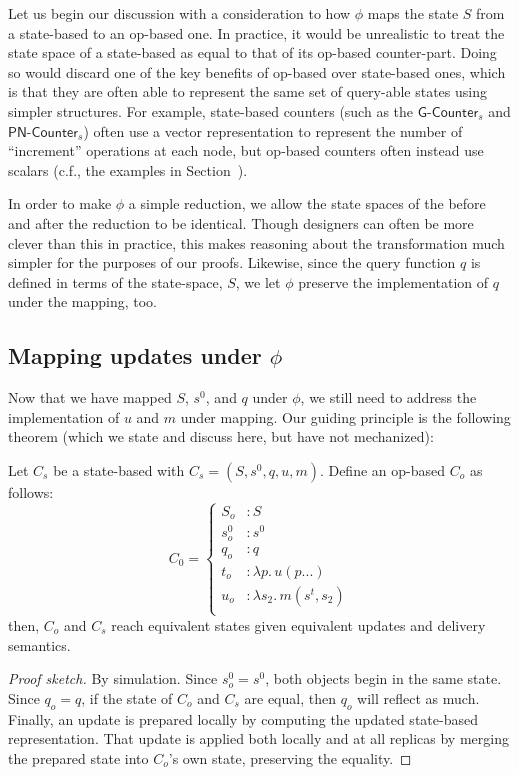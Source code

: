 Let us begin our discussion with a consideration to how $\phi$ maps the state
$S$ from a state-based \CRDT to an op-based one. In practice, it would be
unrealistic to treat the state space of a state-based \CRDT as equal to that of
its op-based counter-part. Doing so would discard one of the key benefits of
op-based \CRDTs over state-based ones, which is that they are often able to
represent the same set of query-able states using simpler structures. For
example, state-based counters (such as the $\textsf{G-Counter}_s$ and
$\textsf{PN-Counter}_s$) often use a vector representation to represent the
number of ``increment'' operations at each node, but op-based counters often
instead use scalars (c.f., the examples in
Section~\label{sec:example-gcounter}).

In order to make $\phi$ a simple reduction, we allow the state spaces of the
\CRDT before and after the reduction to be identical. Though \CRDT designers can
often be more clever than this in practice, this makes reasoning about the
transformation much simpler for the purposes of our proofs.  Likewise, since the
query function $q$ is defined in terms of the state-space, $S$, we let $\phi$
preserve the implementation of $q$ under the mapping, too.

\subsection{Mapping updates under $\phi$}
\label{sec:states-under-phi}
Now that we have mapped $S$, $s^0$, and $q$ under $\phi$, we still need to
address the implementation of $u$ and $m$ under mapping. Our guiding principle
is the following theorem (which we state and discuss here, but have not
mechanized):
\begin{theorem}
  Let $C_s$ be a state-based \CRDT with $C_s = (S, s^0, q, u, m)$. Define an
  op-based \CRDT $C_o$ as follows:
  \[
    C_0 = \left\{ \begin{aligned}
      S_o &: S \\
      s^0_o &: s^0 \\
      q_o &: q \\
      t_o &: \lambda p.\, u(p...) \\
      u_o &: \lambda s_2.\, m(s^t, s_2) \\
    \end{aligned} \right.
  \]
  then, $C_o$ and $C_s$ reach equivalent states given equivalent updates and
  delivery semantics.
\end{theorem}
\begin{proof}[Proof sketch]
By simulation. Since $s^0_o = s^0$, both objects begin in the same state. Since
$q_o = q$, if the state of $C_o$ and $C_s$ are equal, then $q_o$ will reflect as
much. Finally, an update is prepared locally by computing the updated
state-based representation. That update is applied both locally and at all
replicas by merging the prepared state into $C_o$'s own state, preserving the
equality.
\end{proof}

